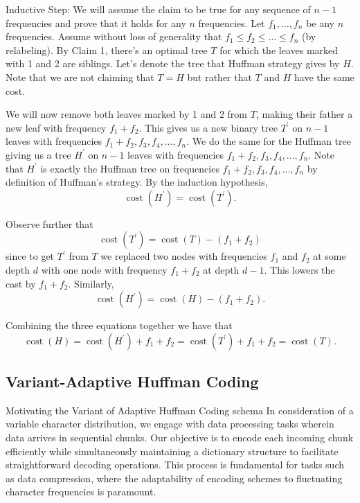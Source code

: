 \documentclass[scrartcl]{article}
\begin{document}
Inductive Step: We will assume the claim to be true for any sequence of $n-1$ frequencies and prove that it holds for any $n$ frequencies. Let $f_1, \ldots, f_n$ be any $n$ frequencies. Assume without loss of generality that $f_1 \leq f_2 \leq \ldots \leq f_n$ (by relabeling). By Claim 1, there's an optimal tree $T$ for which the leaves marked with 1 and 2 are siblings. Let's denote the tree that Huffman strategy gives by $H$. Note that we are not claiming that $T=H$ but rather that $T$ and $H$ have the same cost.

We will now remove both leaves marked by 1 and 2 from $T$, making their father a new leaf with frequency $f_1+f_2$. This gives us a new binary tree $T^{\prime}$ on $n-1$ leaves with frequencies $f_1+f_2, f_3, f_4, \ldots, f_n$. We do the same for the Huffman tree giving us a tree $H^{\prime}$ on $n-1$ leaves with frequencies $f_1+f_2, f_3, f_4, \ldots, f_n$. Note that $H^{\prime}$ is exactly the Huffman tree on frequencies $f_1+f_2, f_3, f_4, \ldots, f_n$ by definition of Huffman's strategy. By the induction hypothesis,
$$
\operatorname{cost}\left(H^{\prime}\right)=\operatorname{cost}\left(T^{\prime}\right) .
$$

Observe further that
$$
\operatorname{cost}\left(T^{\prime}\right)=\operatorname{cost}(T)-\left(f_1+f_2\right)
$$
since to get $T^{\prime}$ from $T$ we replaced two nodes with frequencies $f_1$ and $f_2$ at some depth $d$ with one node with frequency $f_1+f_2$ at depth $d-1$. This lowers the cast by $f_1+f_2$. Similarly,
$$
\operatorname{cost}\left(H^{\prime}\right)=\operatorname{cost}(H)-\left(f_1+f_2\right) .
$$

Combining the three equations together we have that
$$
\operatorname{cost}(H)=\operatorname{cost}\left(H^{\prime}\right)+f_1+f_2=\operatorname{cost}\left(T^{\prime}\right)+f_1+f_2=\operatorname{cost}(T) .
$$

\subsection{Variant-Adaptive Huffman Coding}
Motivating the Variant of Adaptive Huffman Coding schema 
In consideration of a variable character distribution, we engage with data processing tasks wherein data arrives in sequential chunks. Our objective is to encode each incoming chunk efficiently while simultaneously maintaining a dictionary structure to facilitate straightforward decoding operations. This process is fundamental for tasks such as data compression, where the adaptability of encoding schemes to fluctuating character frequencies is paramount.
\end{document}
